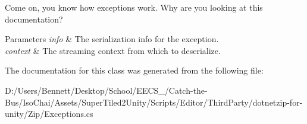 Come on, you know how exceptions work. Why are you looking at this documentation? 


\begin{DoxyParams}{Parameters}
{\em info} & The serialization info for the exception.\\
\hline
{\em context} & The streaming context from which to deserialize.\\
\hline
\end{DoxyParams}


The documentation for this class was generated from the following file\+:\begin{DoxyCompactItemize}
\item 
D\+:/\+Users/\+Bennett/\+Desktop/\+School/\+E\+E\+C\+S\+\_/\+Catch-\/the-\/\+Bus/\+Iso\+Chai/\+Assets/\+Super\+Tiled2\+Unity/\+Scripts/\+Editor/\+Third\+Party/dotnetzip-\/for-\/unity/\+Zip/Exceptions.\+cs\end{DoxyCompactItemize}
